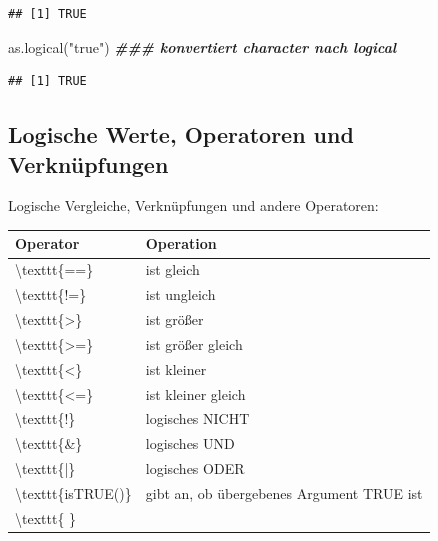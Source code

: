 \documentclass[
]{book}
\newenvironment{Shaded}{\begin{snugshade}}{\end{snugshade}}
\newcommand{\DocumentationTok}[1]{\textcolor[rgb]{0.56,0.35,0.01}{\textbf{\textit{#1}}}}
\newcommand{\FunctionTok}[1]{\textcolor[rgb]{0.00,0.00,0.00}{#1}}
\newcommand{\NormalTok}[1]{#1}
\newcommand{\StringTok}[1]{\textcolor[rgb]{0.31,0.60,0.02}{#1}}
\begin{document}
\begin{verbatim}
## [1] TRUE
\end{verbatim}

\begin{Shaded}
\begin{Highlighting}[]
\FunctionTok{as.logical}\NormalTok{(}\StringTok{"true"}\NormalTok{)  }\DocumentationTok{\#\#\# konvertiert character nach logical}
\end{Highlighting}
\end{Shaded}

\begin{verbatim}
## [1] TRUE
\end{verbatim}

\hypertarget{logische-werte-operatoren-und-verknuxfcpfungen}{%
\subsection*{Logische Werte, Operatoren und Verknüpfungen}\label{logische-werte-operatoren-und-verknuxfcpfungen}}

Logische Vergleiche, Verknüpfungen und andere Operatoren:

\begin{table}
\centering\begingroup\fontsize{15}{17}\selectfont

\begin{tabular}[t]{l|l}
\hline
Operator & Operation\\
\hline
\textbackslash{}texttt\{==\} & ist gleich\\
\hline
\textbackslash{}texttt\{!=\} & ist ungleich\\
\hline
\textbackslash{}texttt\{>\} & ist größer\\
\hline
\textbackslash{}texttt\{>=\} & ist größer gleich\\
\hline
\textbackslash{}texttt\{<\} & ist kleiner\\
\hline
\textbackslash{}texttt\{<=\} & ist kleiner gleich\\
\hline
\textbackslash{}texttt\{!\} & logisches NICHT\\
\hline
\textbackslash{}texttt\{\&\} & logisches UND\\
\hline
\textbackslash{}texttt\{|\} & logisches ODER\\
\hline
\textbackslash{}texttt\{isTRUE()\} & gibt an, ob übergebenes Argument TRUE ist\\
\hline
\textbackslash{}texttt\{ \} & \\
\hline
\end{tabular}
\endgroup{}
\end{table}
\end{document}
